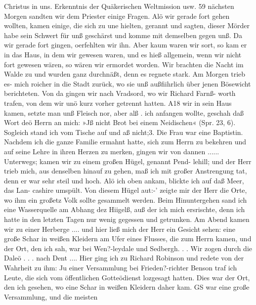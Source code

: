 Christus in uns. Erkenntnis der Quäkerischen Weltmission usw. 59
nächsten Morgen sandten wir dem Priester einige Fragen. Alö
wir gerade fort gehen wollten, kamen einige, die sich zu une
hielten, gerannt und sagten, dieser Mörder habe sein Schwert
für unß geschärst und komme mit demselben gegen unß. Da wir
gerade fort gingen, oerfehlten wir ihn. Aber kaum waren wir
sort, so kam er in das Haus, in dem wir gewesen waren, und
es hieß allgemein, wenn wir nicht fort gewesen wären, so wären
wir ermordet worden. Wir brachten die Nacht im Walde zu
und wurden ganz durchnäßt, denn es regnete stark. Am Morgen
trieb es- mich roicher in die Stadt zurück, wo sie unß außfiihrlich
über jenen Bösewicht berichteten.
Von da gingen wir nach Vradsord, wo wir Richard Farnß-
worth trafen, von dem wir unö kurz vorher getrennt hatten.
A18 wir in sein Haus kamen, setzte man unß Fleisch nor, aber alß
. ich anfangen wollte, geschah daß Wort deö Herrn an mich: »Jß nicht
Brot bei einem Neidischen« (Spr. 23, 6). Sogleich stand ich
vom Tische auf und aß nicht;3. Die Frau war eine Baptistin.
Nachdem ich die ganze Familie ermahnt hatte, sich zum Herrn
zu bekehren und auf seine Lehre in ihren Herzen zu merken,
gingen wir von dannen ......
Unterwegs; kamen wir zu einem großen Hügel, genannt Pend-
lehill; und der Herr trieb mich, aus denselben hinauf zu gehen,
maß ich mit großer Anstrengung tat, denn er war sehr steil und
hoch. Alö ich oben ankam, blickte ich auf daß Meer, das Lan-
cashire umspült. Von diesem Hügel aut:-’ zeigte mir der Herr
die Orte, wo ihm ein großetz Volk sollte gesammelt werden.
Beim Hinuntergehen sand ich eine Wasserquelle am Abhang
dez Hiigelß, auß der ich mich ersrischte, denn ich hatte in den
letzten Tagen nur wenig gegessen und getrunken. Am Abend
kamen wir zu einer Herberge .... und hier ließ mich der
Herr ein Gesicht sehen: eine große Schar in weißen Kleidern
am Ufer eines Flusses, die zum Herrn kamen, und der Ort, den
ich sah, war bei Wen?-leydale und Sedbergh. . .
Wir zogen durch die Daleö . . . nach Dent .... Hier ging
ich zu Richard Robinson und redete von der Wahrheit zu ihm:
Ju einer Versammlung bei Frieden?-richter Benson traf ich Leute,
die sich vom öffentlichen Gotteödienst lozgesagt hatten. Dies
war der Ort, den ich gesehen, wo eine Schar in weißen Kleidern
daher kam. GS war eine große Versammlung, und die meisten



